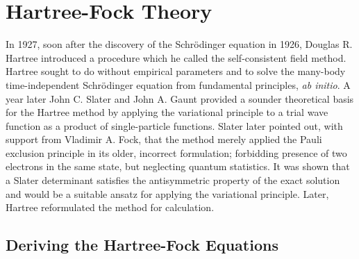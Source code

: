\chapter{Hartree-Fock Theory} 

    In 1927, soon after the discovery of the Schrödinger equation in 1926, Douglas R.
    Hartree introduced a procedure which he called the self-consistent field 
    method\cite{hartree1928wave}. 
    Hartree sought to do without empirical parameters and
    to solve the many-body time-independent Schrödinger equation from fundamental
    principles, \emph{ab initio}. A year later John C. Slater and John A. Gaunt 
    provided a sounder theoretical basis for the Hartree method by applying the 
    variational principle to a trial wave function as a product of single-particle
    functions\cite{slater1928self}\cite{gaunt1928theory}. 
    Slater later pointed out, with support from Vladimir A. Fock, that the method
    merely applied the Pauli exclusion principle in its older, incorrect formulation;
    forbidding presence of two electrons in the same state, but neglecting 
    quantum statistics\cite{slater1930note}\cite{fock1930naherungsmethode}. It was
    shown that a Slater determinant satisfies the antisymmetric property of the
    exact solution and would be a suitable ansatz for applying the variational
    principle. Later, Hartree reformulated the method for 
    calculation\cite{hartree1935self}.

    \section{Deriving the Hartree-Fock Equations}

